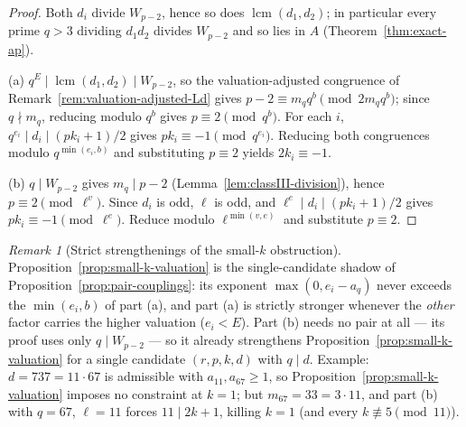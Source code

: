 \documentclass[11pt]{amsart}
\theoremstyle{plain}
\theoremstyle{definition}
\theoremstyle{remark}
\newtheorem{remark}[theorem]{Remark}
\numberwithin{equation}{section}
\begin{document}
\begin{proof}
Both $d_i$ divide $W_{p-2}$, hence so does $\operatorname{lcm}(d_1, d_2)$; in particular every prime $q > 3$ dividing $d_1 d_2$ divides $W_{p-2}$ and so lies in $A$ (Theorem~\ref{thm:exact-ap}).

(a) $q^E \mid \operatorname{lcm}(d_1, d_2) \mid W_{p-2}$, so the valuation-adjusted congruence of Remark~\ref{rem:valuation-adjusted-Ld} gives $p - 2 \equiv m_q q^{b} \pmod{2 m_q q^{b}}$; since $q \nmid m_q$, reducing modulo $q^b$ gives $p \equiv 2 \pmod{q^b}$. For each $i$, $q^{e_i} \mid d_i \mid (p k_i + 1)/2$ gives $p k_i \equiv -1 \pmod{q^{e_i}}$. Reducing both congruences modulo $q^{\min(e_i, b)}$ and substituting $p \equiv 2$ yields $2 k_i \equiv -1$.

(b) $q \mid W_{p-2}$ gives $m_q \mid p - 2$ (Lemma~\ref{lem:classIII-division}), hence $p \equiv 2 \pmod{\ell^{v}}$. Since $d_i$ is odd, $\ell$ is odd, and $\ell^{e} \mid d_i \mid (p k_i + 1)/2$ gives $p k_i \equiv -1 \pmod{\ell^{e}}$. Reduce modulo $\ell^{\min(v, e)}$ and substitute $p \equiv 2$.
\end{proof}

\begin{remark}[Strict strengthenings of the small-$k$ obstruction]\label{rem:couplings-strengthen}
Proposition~\ref{prop:small-k-valuation} is the single-candidate shadow of Proposition~\ref{prop:pair-couplings}: its exponent $\max(0, e_i - a_q)$ never exceeds the $\min(e_i, b)$ of part (a), and part (a) is strictly stronger whenever the \emph{other} factor carries the higher valuation ($e_i < E$). Part (b) needs no pair at all --- its proof uses only $q \mid W_{p-2}$ --- so it already strengthens Proposition~\ref{prop:small-k-valuation} for a single candidate $(r, p, k, d)$ with $q \mid d$. Example: $d = 737 = 11 \cdot 67$ is admissible with $a_{11}, a_{67} \geq 1$, so Proposition~\ref{prop:small-k-valuation} imposes no constraint at $k = 1$; but $m_{67} = 33 = 3 \cdot 11$, and part (b) with $q = 67$, $\ell = 11$ forces $11 \mid 2k + 1$, killing $k = 1$ (and every $k \not\equiv 5 \pmod{11}$).
\end{remark}
\end{document}
